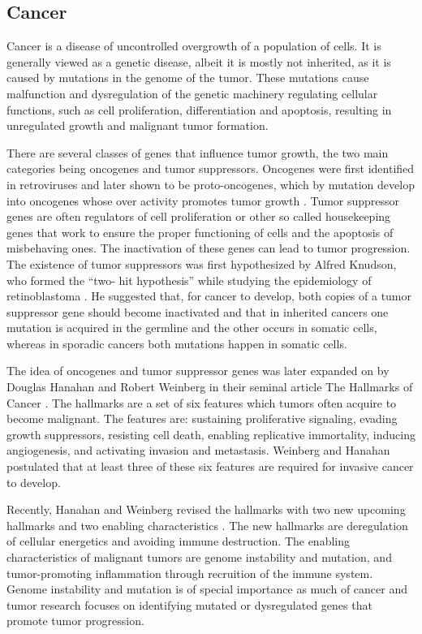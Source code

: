 \subsection{Cancer}\label{cancer}

Cancer is a disease of uncontrolled overgrowth of a population of cells. It is
generally viewed as a genetic disease, albeit it is mostly not inherited, as it is
caused by  mutations in the genome of the tumor. These mutations cause malfunction
and dysregulation of the genetic machinery regulating cellular functions, such
as cell proliferation, differentiation and apoptosis, resulting in
unregulated growth and malignant tumor formation.

There are several classes of genes that influence tumor growth, the two main
categories being oncogenes and tumor suppressors. Oncogenes were first
identified in retroviruses and later shown to be proto-oncogenes, which by
mutation develop into oncogenes whose over activity promotes tumor growth
\citep{Varmus1988}. Tumor suppressor genes are often regulators of cell
proliferation or other so called housekeeping genes that work to ensure the
proper functioning of cells and the apoptosis of misbehaving ones. The
inactivation of these genes can lead to tumor progression. The existence of
tumor suppressors was first hypothesized by Alfred Knudson, who formed the “two-
hit hypothesis” while studying the epidemiology of retinoblastoma
\citep{Knudson1971}. He suggested that, for cancer to develop, both copies of
a tumor suppressor gene should become inactivated and that in inherited
cancers one mutation is acquired in the germline and the other occurs in
somatic cells, whereas in sporadic cancers both mutations happen in somatic
cells.

The idea of oncogenes and tumor suppressor genes was later expanded on by
Douglas Hanahan and Robert Weinberg in their seminal article The Hallmarks of
Cancer \citep{Hanahan2000}. The hallmarks are a set of six features which
tumors often acquire to become malignant. The features are: sustaining
proliferative signaling, evading growth suppressors, resisting cell death,
enabling replicative immortality, inducing angiogenesis, and activating
invasion and metastasis. Weinberg and Hanahan postulated that at least three
of these six features are required for invasive cancer to develop.

Recently, Hanahan and Weinberg revised the hallmarks with two new upcoming
hallmarks and two enabling characteristics \citep{Hanahan2011}. The new
hallmarks are deregulation of cellular energetics and avoiding immune
destruction. The enabling characteristics of malignant tumors are genome
instability and mutation, and tumor-promoting inflammation through recruition
of the immune system. Genome instability and mutation is of special importance
as much of cancer and tumor research focuses on identifying mutated or
dysregulated genes that promote tumor progression.



